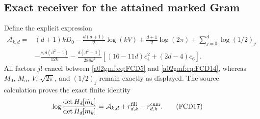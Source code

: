 \documentclass[11pt,a4paper]{article}
\begin{document}
\subsection{Exact receiver for the attained marked Gram}

Define the explicit expression
\begin{equation}
 \begin{split}
 \mathcal A_{k,d}={}&
 (d+1)kD_0-\frac{d(d+1)}2\log(kV)
 +\frac{d+1}2\log(2\pi)+\sum_{j=0}^d\log(1/2)_j\\
 &-\frac{c_4d(d^2-1)}{12k}
 -\frac{d(d^2-1)}{288k^2}
          [(16-11d)c_4^2+(2d-4)c_6].
 \end{split}
 \tag{FCD16}\label{a02gmf:eq:FCD16}
\end{equation}
All factors \(j!\) cancel between \eqref{a02gmf:eq:FCD5} and
\eqref{a02gmf:eq:FCD14}, whereas \(M_0\), \(M_\alpha\), \(V\),
\(\sqrt{2\pi}\), and \((1/2)_j\) remain exactly as displayed.
The source calculation proves the exact finite identity
\begin{equation}
 \log\frac{\det H_d[\widetilde m_k]}{\det H_d[m_k]}
       =\mathcal A_{k,d}+r_{d,k}^{\rm fill}-r_{d,k}^{\rm cum}.
 \tag{FCD17}\label{a02gmf:eq:FCD17}
\end{equation}
\end{document}
